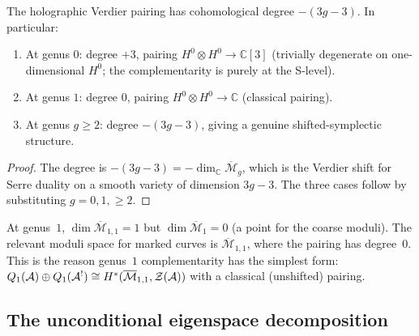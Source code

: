 \begin{proposition}
The holographic Verdier pairing has cohomological degree
$-(3g - 3)$. In particular:
\begin{enumerate}[label=\textup{(\alph*)}]
\item At genus $0$: degree $+3$, pairing
 $H^0 \otimes H^0 \to \mathbb{C}[3]$
 \textup{(}trivially degenerate on one-dimensional $H^0$;
 the complementarity is purely at the S-level\textup{)}.
\item At genus $1$: degree $0$, pairing
 $H^0 \otimes H^0 \to \mathbb{C}$
 \textup{(}classical pairing\textup{)}.
\item At genus $g \ge 2$: degree $-(3g - 3)$,
 giving a genuine shifted-symplectic structure.
\end{enumerate}
\end{proposition}

\begin{proof}
The degree is $-(3g - 3) = -\dim_{\mathbb{C}}
\overline{\mathcal{M}}_g$, which is the Verdier shift for
Serre duality on a smooth variety of dimension $3g - 3$.
The three cases follow by substituting $g = 0, 1, \ge 2$.
\end{proof}

\begin{remark}
At genus~$1$, $\dim \overline{\mathcal{M}}_{1,1} = 1$
but $\dim \overline{\mathcal{M}}_1 = 0$ (a point for the
coarse moduli). The relevant moduli space for marked curves
is $\overline{\mathcal{M}}_{1,1}$, where the pairing has
degree~$0$. This is the reason genus~$1$ complementarity
has the simplest form:
$Q_1(\mathcal{A}) \oplus Q_1(\mathcal{A}^!) \cong H^*(\overline{\mathcal{M}}_{1,1},
\mathcal{Z}(\mathcal{A}))$ with a classical (unshifted) pairing.
\end{remark}

%
%

\subsection{The unconditional eigenspace decomposition}
\label{subsec:thqg-III-eigenspace-decomposition}

